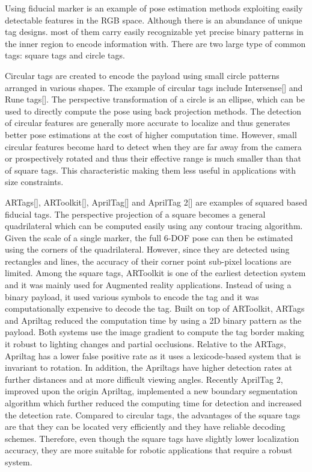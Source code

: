 	Using fiducial marker is an example of pose estimation methods exploiting easily detectable features in the RGB space. Although there is an abundance of unique tag designs. most of them carry easily recognizable yet precise binary patterns in the inner region to encode information with. There are two large type of common tags: square tags and circle tags. 
	
	Circular tags are created to encode the payload using small circle patterns arranged in various shapes. The example of circular tags include Intersense[] and Rune tags[]. The perspective transformation of a circle is an ellipse, which can be used to directly compute the pose using back projection methods. The detection of circular features are generally more accurate to localize and thus generates better pose estimations at the cost of higher computation time. However, small circular features become hard to detect when they are far away from the camera or prospectively rotated and thus their effective range is much smaller than that of square tags. This characteristic making them less useful in applications with size constraints. 
	
	ARTags[], ARToolkit[], AprilTag[] and AprilTag 2[] are examples of squared based fiducial tags. The perspective projection of a square becomes a general quadrilateral which can be computed easily using any contour tracing algorithm. Given the scale of a single marker, the full 6-DOF pose can then be estimated using the corners of the quadrilateral. However, since they are detected using rectangles and lines, the accuracy of their corner point sub-pixel locations are limited. Among the square tags, ARToolkit is one of the earliest detection system and it was mainly used for Augmented reality applications. Instead of using a binary payload, it used various symbols to encode the tag and it was computationally expensive to decode the tag. Built on top of ARToolkit, ARTags and Apriltag reduced the computation time by using a 2D binary pattern as the payload. Both systems use the image gradient to compute the tag border making it robust to lighting changes and partial occlusions. Relative to the ARTags, Apriltag has a lower false positive rate as it uses a lexicode-based system that is invariant to rotation. In addition, the Apriltags have higher detection rates at further distances and at more difficult viewing angles. Recently AprilTag 2, improved upon the origin Apriltag, implemented a new boundary segmentation algorithm which further reduced the computing time for detection and increased the detection rate. Compared to circular tags, the advantages of the square tags are that they can be located very efficiently and they have reliable decoding schemes. Therefore, even though the square tags have slightly lower localization accuracy, they are more suitable for robotic applications that require a robust system.